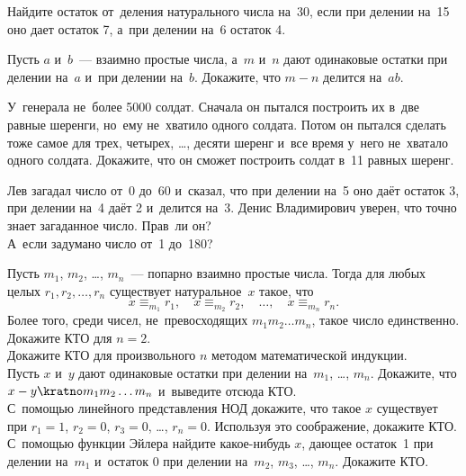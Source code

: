 


\begin{problems}

\item
Найдите остаток от~деления натурального числа на~30, если при делении на~15 оно
дает остаток 7, а~при делении на~6 остаток 4.

\item
Пусть $a$ и~$b$~--- взаимно простые числа, а~$m$ и~$n$ дают одинаковые остатки
при делении на~$a$ и~при делении на~$b$.
Докажите, что $m - n$ делится на~$a b$.

\item
У~генерала не~более 5000 солдат.
Сначала он пытался построить их в~две равные шеренги, но~ему не~хватило одного
солдата.
Потом он пытался сделать тоже самое для трех, четырех, \ldots, десяти шеренг
и~все время у~него не~хватало одного солдата.
Докажите, что он сможет построить солдат в~11 равных шеренг.

\item
\subproblem
Лев загадал число от~0 до~60 и~сказал, что при делении на~5 оно даёт остаток 3,
при делении на~4 даёт 2 и~делится на~3.
Денис Владимирович уверен, что точно знает загаданное число.
Прав~ли он?
\\
\subproblem
А~если задумано число от~1 до~180?

\item{}
Пусть $m_{1}$, $m_{2}$, \ldots, $m_{n}$~--- попарно взаимно простые числа.
Тогда для любых целых $r_{1}, r_{2}, \ldots, r_{n}$ существует натуральное~$x$
такое, что
\[
    x \equiv_{m_{1}} r_{1}
, \quad
    x \equiv_{m_{2}} r_{2}
, \quad \ldots, \quad
    x \equiv_{m_{n}} r_{n}
. \]
Более того, среди чисел, не~превосходящих $m_{1} m_{2} \ldots m_{n}$, такое
число единственно.
\\
\subproblem
Докажите КТО для $n = 2$.
\\
\subproblem
Докажите КТО для произвольного $n$ методом математической индукции.
\\
\subproblem
Пусть $x$ и~$y$ дают одинаковые остатки при делении
на~$m_{1}$, \ldots, $m_{n}$.
Докажите, что $x - y \kratno m_{1} m_{2} \ldots m_{n}$ и~выведите отсюда КТО.
\\
\subproblem
С~помощью линейного представления НОД докажите, что такое $x$ существует при
$r_{1} = 1$, $r_{2} = 0$, $r_{3} = 0$, \ldots, $r_{n} = 0$.
Используя это соображение, докажите КТО.
\\
\subproblem
С~помощью функции Эйлера найдите какое-нибудь $x$, дающее остаток~1 при делении
на~$m_{1}$ и~остаток 0 при делении на~$m_{2}$, $m_{3}$, \ldots, $m_{n}$.
Докажите КТО.


\end{problems}
